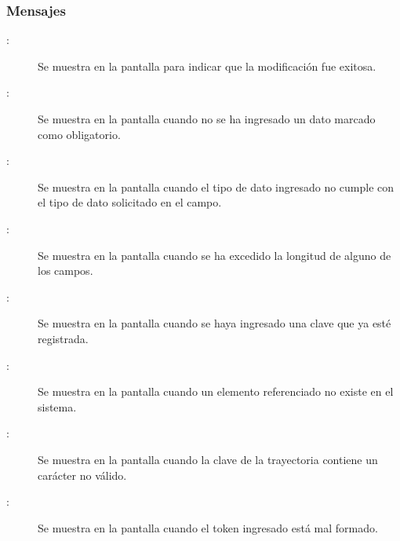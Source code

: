 \subsubsection{Mensajes}

	
\begin{description}
	\item[ :] Se muestra en la pantalla  para indicar que la modificación fue exitosa.
	\item[:] Se muestra en la pantalla  cuando no se ha ingresado un dato marcado como obligatorio.
	\item[:] Se muestra en la pantalla  cuando el tipo de dato ingresado no cumple con el tipo de dato solicitado en el campo.
	\item[:] Se muestra en la pantalla  cuando se ha excedido la longitud de alguno de los campos.
	\item[:] Se muestra en la pantalla  cuando se haya ingresado una clave que ya esté registrada.
	\item[:] Se muestra en la pantalla  cuando un elemento referenciado no existe en el sistema.
	\item[:] Se muestra en la pantalla  cuando la clave de la trayectoria contiene un carácter no válido.
	\item[:] Se muestra en la pantalla  cuando el token ingresado está mal formado.
\end{description}
